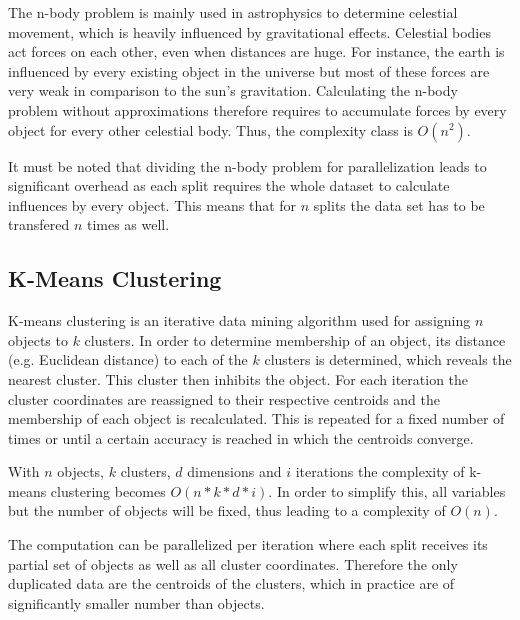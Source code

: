The n-body problem is mainly used in astrophysics to determine celestial movement, which is heavily influenced by gravitational effects. Celestial bodies act forces on each other, even when distances are huge. For instance, the earth is influenced by every existing object in the universe but most of these forces are very weak in comparison to the sun's gravitation. Calculating the n-body problem without approximations therefore requires to accumulate forces by every object for every other celestial body. Thus, the complexity class is $O(n^2)$.

It must be noted that dividing the n-body problem for parallelization leads to significant overhead as each split requires the whole dataset to calculate influences by every object. This means that for $n$ splits the data set has to be transfered $n$ times as well.

\subsection*{K-Means Clustering}

K-means clustering is an iterative data mining algorithm used for assigning $n$ objects to $k$ clusters. In order to determine membership of an object, its distance (e.g. Euclidean distance) to each of the $k$ clusters is determined, which reveals the nearest cluster. This cluster then inhibits the object. For each iteration the cluster coordinates are reassigned to their respective centroids and the membership of each object is recalculated. This is repeated for a fixed number of times or until a certain accuracy is reached in which the centroids converge.

With $n$ objects, $k$ clusters, $d$ dimensions and $i$ iterations the complexity of k-means clustering becomes $O(n*k*d*i)$. In order to simplify this, all variables but the number of objects will be fixed, thus leading to a complexity of $O(n)$.

The computation can be parallelized per iteration where each split receives its partial set of objects as well as all cluster coordinates. Therefore the only duplicated data are the centroids of the clusters, which in practice are of significantly smaller number than objects.
